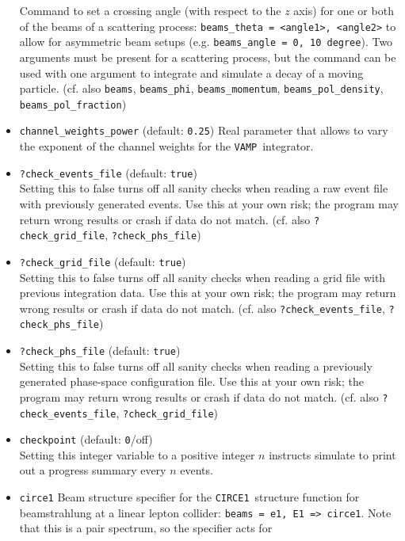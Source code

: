 \documentclass[12pt]{book}
\newcommand{\ttt}[1]{\texttt{#1}}
\newcommand{\vamp}{\texttt{VAMP}}
\newcommand{\circeone}{\texttt{CIRCE1}}
\begin{document}
\begin{itemize}
Command to set a crossing angle (with respect to the $z$ axis) for one
or both of the beams of a 
scattering process: \ttt{beams\_theta = <angle1>, <angle2>} to allow 
for asymmetric beam setups (e.g. \ttt{beams\_angle = 0, 10
degree}). Two arguments must be present for a scattering process, but
the command can be used with one argument to integrate and simulate a
decay of a moving particle. (cf. also \ttt{beams}, \ttt{beams\_phi},
\ttt{beams\_momentum}, \ttt{beams\_pol\_density},
\ttt{beams\_pol\_fraction})
\item
\ttt{channel\_weights\_power} \qquad (default: \ttt{0.25}) \newline
Real parameter that allows to vary the exponent of the channel weights
for the \vamp\ integrator. 
\item
\ttt{?check\_events\_file} \qquad (default: \ttt{true}) \\
Setting this to false turns off all sanity checks when reading a raw
event file with previously generated events.  Use this at your own
risk; the program may return wrong results or crash if data do not
match. (cf. also \ttt{?check\_grid\_file}, \ttt{?check\_phs\_file})
\item
\ttt{?check\_grid\_file} \qquad (default: \ttt{true}) \\
Setting this to false turns off all sanity checks when reading a grid
file with previous integration data.  Use this at your own risk; the
program may return wrong results or crash if data do not
match. (cf. also \ttt{?check\_events\_file}, \ttt{?check\_phs\_file})
\item
\ttt{?check\_phs\_file}  \qquad (default: \ttt{true}) \\
Setting this to false turns off all sanity checks when reading a
previously generated phase-space configuration file.  Use this at your
own risk; the program may return wrong results or crash if data do not
match. (cf. also \ttt{?check\_events\_file}, \ttt{?check\_grid\_file})
\item
\ttt{checkpoint} \qquad (default: \ttt{0}/off) \\
Setting this integer variable to a positive integer $n$ instructs
simulate to print out a progress summary every $n$ events.
\item
\ttt{circe1} \newline
Beam structure specifier for the \circeone\ structure function for
beamstrahlung at a linear lepton collider: \ttt{beams = e1, E1 =>
circe1}. Note that this is a pair spectrum, so the specifier acts for

\end{itemize}
\end{document}
